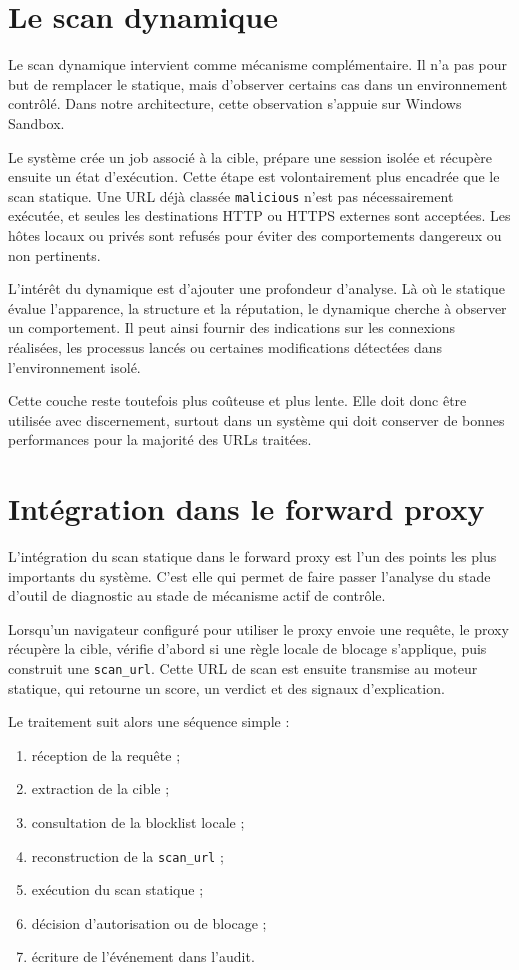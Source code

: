 ﻿\documentclass[12pt,a4paper]{report}
\begin{document}
\chapter{Le scan dynamique}

Le scan dynamique intervient comme mécanisme complémentaire. Il n'a pas pour but de remplacer le statique, mais d'observer certains cas dans un environnement contrôlé. Dans notre architecture, cette observation s'appuie sur Windows Sandbox.

Le système crée un job associé à la cible, prépare une session isolée et récupère ensuite un état d'exécution. Cette étape est volontairement plus encadrée que le scan statique. Une URL déjà classée \texttt{malicious} n'est pas nécessairement exécutée, et seules les destinations HTTP ou HTTPS externes sont acceptées. Les hôtes locaux ou privés sont refusés pour éviter des comportements dangereux ou non pertinents.

L'intérêt du dynamique est d'ajouter une profondeur d'analyse. Là où le statique évalue l'apparence, la structure et la réputation, le dynamique cherche à observer un comportement. Il peut ainsi fournir des indications sur les connexions réalisées, les processus lancés ou certaines modifications détectées dans l'environnement isolé.

Cette couche reste toutefois plus coûteuse et plus lente. Elle doit donc être utilisée avec discernement, surtout dans un système qui doit conserver de bonnes performances pour la majorité des URLs traitées.

\chapter{Intégration dans le forward proxy}

L'intégration du scan statique dans le forward proxy est l'un des points les plus importants du système. C'est elle qui permet de faire passer l'analyse du stade d'outil de diagnostic au stade de mécanisme actif de contrôle.

Lorsqu'un navigateur configuré pour utiliser le proxy envoie une requête, le proxy récupère la cible, vérifie d'abord si une règle locale de blocage s'applique, puis construit une \texttt{scan\_url}. Cette URL de scan est ensuite transmise au moteur statique, qui retourne un score, un verdict et des signaux d'explication.

Le traitement suit alors une séquence simple :

\begin{enumerate}[leftmargin=1.2cm]
    \item réception de la requête ;
    \item extraction de la cible ;
    \item consultation de la blocklist locale ;
    \item reconstruction de la \texttt{scan\_url} ;
    \item exécution du scan statique ;
    \item décision d'autorisation ou de blocage ;
    \item écriture de l'événement dans l'audit.
\end{enumerate}
\end{document}
